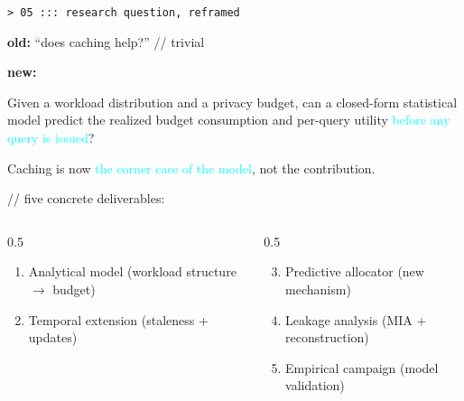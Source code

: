 \documentclass[aspectratio=169,10pt]{beamer}
\renewcommand{\emph}[1]{\textcolor{cyan}{#1}}
\newcommand{\hi}[1]{\textcolor{neon}{#1}}
\newcommand{\dimt}[1]{\textcolor{dim}{#1}}
\begin{document}
\begin{frame}{\texttt{> 05 ::: research question, reframed}}

\textbf{\color{magenta} old:} ``does caching help?'' \hfill {\color{dim}\ttfamily // trivial}

\vspace{0.6em}
\textbf{\color{neon} new:}

\begin{block}{}
Given a \hi{workload distribution} and a \hi{privacy budget}, can a \hi{closed-form statistical model} predict the realized budget consumption and per-query utility \emph{before any query is issued}?
\end{block}

\vspace{0.7em}
Caching is now \emph{the corner case of the model}, not the contribution.

\vspace{1em}
{\color{dim}\ttfamily // five concrete deliverables:}
\begin{columns}[T,onlytextwidth]
\begin{column}{0.5\textwidth}
\begin{enumerate}
  \item \hi{Analytical model} \dimt{(workload structure $\to$ budget)}
  \item \hi{Temporal extension} \dimt{(staleness + updates)}
\end{enumerate}
\end{column}
\begin{column}{0.5\textwidth}
\begin{enumerate}
\setcounter{enumi}{2}
  \item \hi{Predictive allocator} \dimt{(new mechanism)}
  \item Leakage analysis \dimt{(MIA + reconstruction)}
  \item Empirical campaign \dimt{(model validation)}
\end{enumerate}
\end{column}
\end{columns}

\end{frame}
\end{document}
